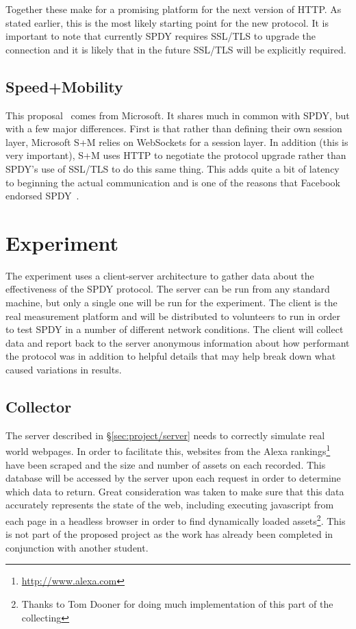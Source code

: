 \documentclass[11pt,letterpaper,notitlepage]{article}
\begin{document}
Together these make for a promising platform for the next version of HTTP.  As
stated earlier, this is the most likely starting point for the new protocol. It
is important to note that currently SPDY requires SSL/TLS to upgrade the
connection and it is likely that in the future SSL/TLS will be explicitly
required.
  
\subsection{Speed+Mobility}
\label{sec:intro/s+m}
This proposal~\cite{sm} comes from Microsoft.  It shares much in common with SPDY, but
with a few major differences. First is that rather than defining their own
session layer, Microsoft S+M relies on WebSockets for a session layer.  In
addition (this is very important), S+M uses HTTP to negotiate the protocol
upgrade rather than SPDY's use of SSL/TLS to do this same thing. This adds quite
a bit of latency to beginning the actual communication and is one of the reasons that
Facebook endorsed SPDY~\cite{fbook}.


\section{Experiment}
\label{sec:project}
The experiment uses a client-server architecture to gather data about the
effectiveness of the SPDY protocol. The server can be run from any standard
machine, but only a single one will be run for the experiment.  The client is
the real measurement platform and will be distributed to volunteers to run in
order to test SPDY in a number of different network conditions.  The client will
collect data and report back to the server anonymous information about how
performant the protocol was in addition to helpful details that may help break
down what caused variations in results.

\subsection{Collector}
\label{sec:project/collector}
The server described in \S\ref{sec:project/server} needs to correctly simulate
real world webpages. In order to facilitate this, websites from the Alexa
rankings\footnote{\url{http://www.alexa.com}} have been scraped and the size and
number of assets on each recorded.  This database will be accessed by the server
upon each request in order to determine which data to return.  Great
consideration was taken to make sure that this data accurately represents the
state of the web, including executing javascript from each page in a headless
browser in order to find dynamically loaded assets\footnote{Thanks to Tom Dooner
for doing much implementation of this part of the collecting}. This is not part
of the proposed project as the work has already been completed in conjunction
with another student.
\end{document}
